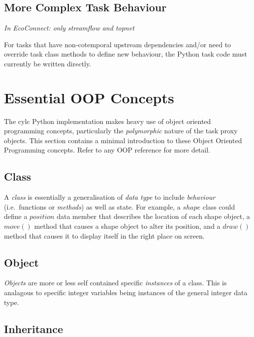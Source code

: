 \documentclass[11pt,a4paper]{article}
\begin{document}
\lstset{language=, numbers=left}

{
\color{Magenta}

}

\subsection{More Complex Task Behaviour}

\textit{In EcoConnect: only streamflow and topnet}

For tasks that have non-cotemporal upstream dependencies and/or need to  
override task class methods to define new behaviour, the Python task
code must currently be written directly. 



\appendix

\section{Essential OOP Concepts}

The cylc Python implementation makes heavy use of object oriented
programming concepts, particularly the {\em polymorphic} nature of
the task proxy objects.  This section contains a minimal introduction
to these Object Oriented Programming concepts.  Refer to any OOP
reference for more detail.

\subsection{Class}

A {\em class} is essentially a generalisation of {\em data type} to
include {\em behaviour} (i.e.\ functions or {\em methods}) as well as
state. For example, a $shape$ class could define a $position$ data
member that describes the location of each shape object, a $move()$
method that causes a shape object to alter its position, and a $draw()$
method that causes it to display itself in the right place on screen.

\subsection{Object}

{\em Objects} are more or less self contained specific {\em instances}
of a class. This is analagous to specific integer variables being 
instances of the general integer data type.

\subsection{Inheritance}
\end{document}
